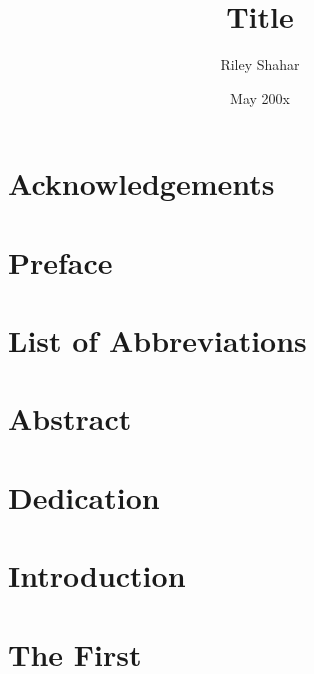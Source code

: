 \documentclass[12pt,twoside]{reedthesis}
\title{Title} %
\author{Riley Shahar}
\date{May 200x} %
\begin{document}
\maketitle
\frontmatter
\pagestyle{empty} %

\chapter*{Acknowledgements}

\chapter*{Preface}

\chapter*{List of Abbreviations}

\tableofcontents
\listoftables
\listoffigures

\chapter*{Abstract}

\chapter*{Dedication}

\mainmatter%
\pagestyle{fancyplain} %

\chapter*{Introduction}

\chapter{The First}

\backmatter{}
\nocite{*}



\end{document}

